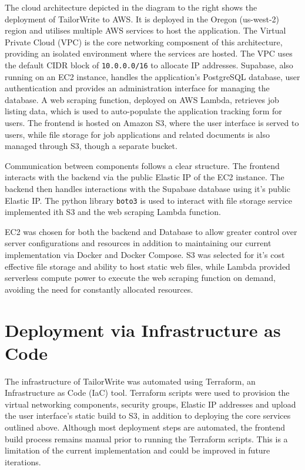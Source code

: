 \documentclass[a4paper, 11pt]{article}
\begin{document}
The cloud architecture depicted in the diagram to the right shows the deployment of TailorWrite to AWS. It is deployed in the Oregon (us-west-2) region and utilises multiple AWS services to host the application. The Virtual Private Cloud (VPC) is the core networking composnent of this architecture, providing an isolated environment where the services are hosted. The VPC uses the default CIDR block of \texttt{10.0.0.0/16} to allocate IP addresses. Supabase, also running on an EC2 instance, handles the application's PostgreSQL database, user authentication and provides an administration interface for managing the database. A web scraping function, deployed on AWS Lambda, retrieves job listing data, which is used to auto-populate the application tracking form for users. The frontend is hosted on Amazon S3, where the user interface is served to users, while file storage for job applications and related documents is also managed through S3, though a separate bucket.

Communication between components follows a clear structure. The frontend interacts with the backend via the public Elastic IP of the EC2 instance. The backend then handles interactions with the Supabase database using it's public Elastic IP. The python library \texttt{boto3} is used to interact with file storage service implemented ith S3 and the web scraping Lambda function. 


EC2 was chosen for both the backend and Database to allow greater control over server configurations and resources in addition to maintaining our current implementation via Docker and Docker Compose. S3 was selected for it's cost effective file storage and ability to host static web files, while Lambda provided serverless compute power to execute the web scraping function on demand, avoiding the need for constantly allocated resources. 

\section{Deployment via Infrastructure as Code}

The infrastructure of TailorWrite was automated using Terraform, an Infrastructure as Code (IaC) tool. Terraform scripts were used to provision the virtual networking components, security groups, Elastic IP addresses and upload the user interface's static build to S3, in addition to deploying the core services outlined above. Although most deployment steps are automated, the frontend build process remains manual prior to running the Terraform scripts. This is a limitation of the current implementation and could be improved in future iterations.
\end{document}

